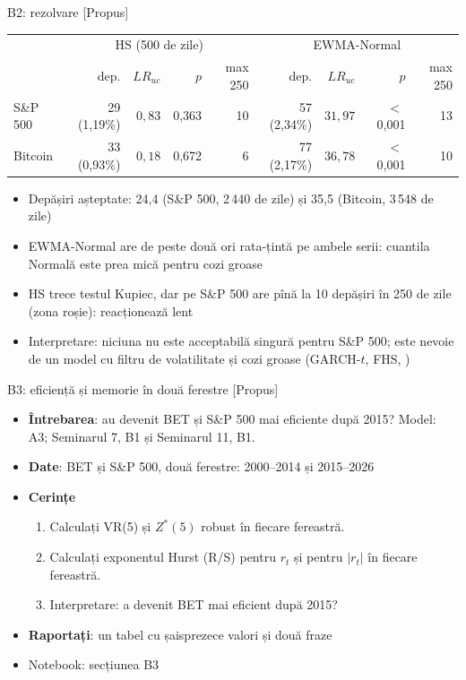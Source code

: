 \ifsolutions
\begin{frame}{B2: rezolvare [Propus]}
\itemsize{\footnotesize}
\begin{center}
\scriptsize
\begin{tabular}{l|rrrr|rrrr}
\toprule
& \multicolumn{4}{c|}{HS (500 de zile)} & \multicolumn{4}{c}{EWMA-Normal} \\ & dep. & $LR_{uc}$ & $p$ & max 250 & dep. & $LR_{uc}$ & $p$ & max 250 \\
\midrule
S\&P 500 & 29 (1{,}19\%) & ${0{,}83}$ & 0{,}363 & 10 & 57 (2{,}34\%) & ${31{,}97}$ & $<$\,0{,}001 & 13 \\
Bitcoin & 33 (0{,}93\%) & ${0{,}18}$ & 0{,}672 & 6 & 77 (2{,}17\%) & ${36{,}78}$ & $<$\,0{,}001 & 10 \\
\bottomrule
\end{tabular}
\end{center}
\begin{itemize}
    \item Depășiri așteptate: 24{,}4 (S\&P 500, 2\,440 de zile) și 35{,}5 (Bitcoin, 3\,548 de zile)
    \item EWMA-Normal are de peste două ori rata-țintă pe ambele serii: cuantila Normală este prea mică pentru cozi groase
    \item HS trece testul Kupiec, dar pe S\&P 500 are pînă la 10 depășiri în 250 de zile (zona roșie): reacționează lent
    \item Interpretare: niciuna nu este acceptabilă singură pentru S\&P 500; este nevoie de un model cu filtru de volatilitate și cozi groase (GARCH-$t$, FHS, )
\end{itemize}
\end{frame}
\fi

\begin{frame}{B3: eficiență și memorie în două ferestre [Propus]}
\itemsize{\footnotesize}
\begin{itemize}
\item \textbf{Întrebarea}: au devenit BET și S\&P 500 mai eficiente după 2015? Model: A3; Seminarul 7, B1 și Seminarul 11, B1.
\item \textbf{Date}: BET și S\&P 500, două ferestre: 2000--2014 și 2015--2026
\item \textbf{Cerințe}
\begin{enumerate}
    \item Calculați VR(5) și $Z^*(5)$ robust în fiecare fereastră.
    \item Calculați exponentul Hurst (R/S) pentru $r_t$ și pentru $|r_t|$ în fiecare fereastră.
    \item Interpretare: a devenit BET mai eficient după 2015?
\end{enumerate}
\item \textbf{Raportați}: un tabel cu șaisprezece valori și două fraze
\item Notebook: secțiunea B3
\end{itemize}
\end{frame}

